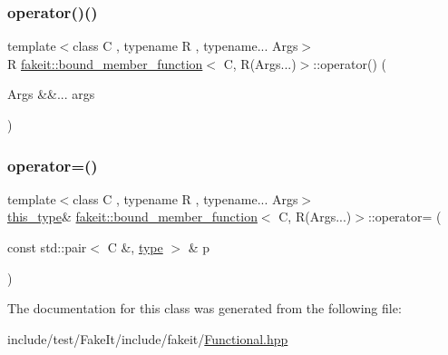 \mbox{\label{classfakeit_1_1bound__member__function_3_01C_00_01R_07Args_8_8_8_08_4_a403d7a7bf0ca3173ed2bf9ce16b8af6f}} 
\subsubsection{\texorpdfstring{operator()()}{operator()()}}
{\footnotesize\ttfamily template$<$class C , typename R , typename... Args$>$ \\
R \mbox{\hyperlink{classfakeit_1_1bound__member__function}{fakeit\+::bound\+\_\+member\+\_\+function}}$<$ C, R(Args...)$>$\+::operator() (\begin{DoxyParamCaption}\item[{Args \&\&...}]{args }\end{DoxyParamCaption})\hspace{0.3cm}{\ttfamily [inline]}}

\mbox{\label{classfakeit_1_1bound__member__function_3_01C_00_01R_07Args_8_8_8_08_4_a797454657783b4b13712d40f0e9a1a6f}} 
\subsubsection{\texorpdfstring{operator=()}{operator=()}}
{\footnotesize\ttfamily template$<$class C , typename R , typename... Args$>$ \\
\mbox{\hyperlink{classfakeit_1_1bound__member__function_3_01C_00_01R_07Args_8_8_8_08_4_a65c1f42260047efb95028bc0ac5a8f09}{this\+\_\+type}}\& \mbox{\hyperlink{classfakeit_1_1bound__member__function}{fakeit\+::bound\+\_\+member\+\_\+function}}$<$ C, R(Args...)$>$\+::operator= (\begin{DoxyParamCaption}\item[{const std\+::pair$<$ C \&, \mbox{\hyperlink{classfakeit_1_1bound__member__function_3_01C_00_01R_07Args_8_8_8_08_4_ac79ac3937ebd63418a5873c044c22cf9}{type}} $>$ \&}]{p }\end{DoxyParamCaption})\hspace{0.3cm}{\ttfamily [inline]}}



The documentation for this class was generated from the following file\+:\begin{DoxyCompactItemize}
\item 
include/test/\+Fake\+It/include/fakeit/\mbox{\hyperlink{Functional_8hpp}{Functional.\+hpp}}\end{DoxyCompactItemize}
